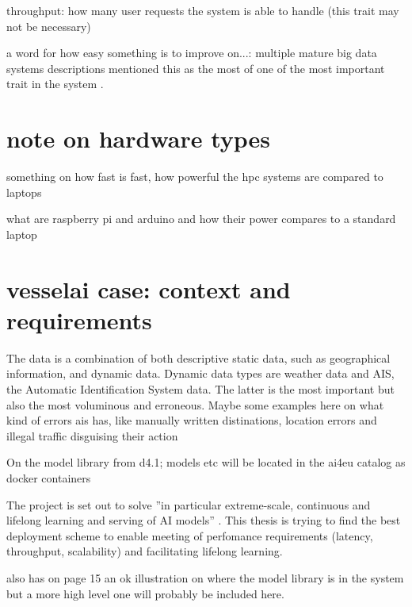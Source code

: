 throughput: how many user requests the system is able to handle (this trait may not be necessary)

a word for how easy something is to improve on...: multiple mature big data systems descriptions mentioned this as the most of one of the most important trait in the system \cite{uber} \cite{facebook}.

\section{note on hardware types}

something on how fast is fast, how powerful the hpc systems are compared to laptops

what are raspberry pi and arduino and how their power compares to a standard laptop

\section{vesselai case: context and requirements}

The data is a combination of both descriptive static data, such as geographical information, and dynamic data. Dynamic data types are weather data and AIS, the Automatic Identification System data. The latter is the most important but also the most voluminous and erroneous. Maybe some examples here on what kind of errors ais has, like manually written distinations, location errors and illegal traffic disguising their action

On the model library from d4.1; models etc will be located in the ai4eu catalog as docker containers \cite{D4.1}

The project is set out to solve ''in  particular  extreme-scale,  continuous  and  lifelong  learning  and  serving  of  AI  models'' \cite{D4.1}. This thesis is trying to find the best deployment scheme to enable meeting of perfomance requirements (latency, throughput, scalability) and facilitating lifelong learning.

\cite{D4.1} also has on page 15 an ok illustration on where the model library is in the system but a more high level one will probably be included here.

